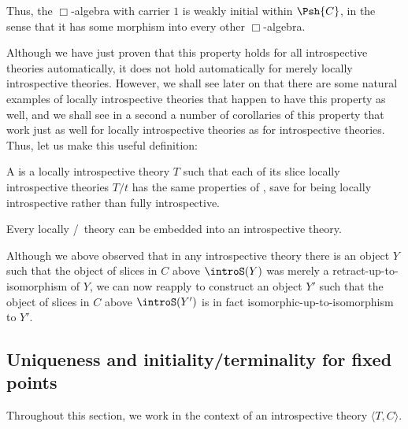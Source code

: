 Thus, the $\Box$-algebra with carrier $1$ is weakly initial within $\Psh{C}$, in the sense that it has some morphism into every other $\Box$-algebra.

Although we have just proven that this property holds for all introspective theories automatically, it does not hold automatically for merely locally introspective theories. However, we shall see later on that there are some natural examples of locally introspective theories that happen to have this property as well, and we shall see in a second a number of corollaries of this property that work just as well for locally introspective theories as for introspective theories. Thus, let us make this useful definition:

\begin{definition}
A  is a locally introspective theory $T$ such that each of its slice locally introspective theories $T/t$ has the same properties of , save for being locally introspective rather than fully introspective.
\end{definition}

\begin{conjecture}
Every locally \Loeb/\ theory can be embedded into an introspective theory.
\end{conjecture}

\begin{observation}
Although we above observed that in any introspective theory there is an object $Y$ such that the object of slices in $C$ above $\introS(Y)$ was merely a retract-up-to-isomorphism of $Y$, we can now reapply  to construct an object $Y'$ such that the object of slices in $C$ above $\introS(Y')$ is in fact isomorphic-up-to-isomorphism to $Y'$. 
\end{observation}

\subsection{Uniqueness and initiality/terminality for fixed points}
Throughout this section, we work in the context of an introspective theory $\langle T, C \rangle$. 

